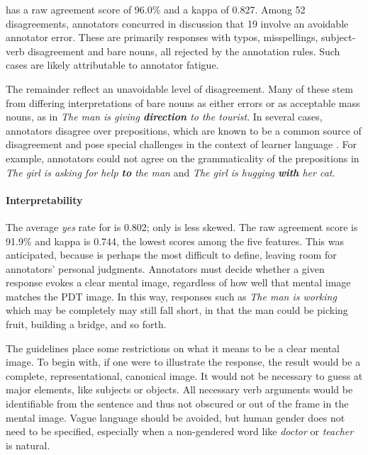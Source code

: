  has a raw agreement score of 96.0\% and a kappa of 0.827. Among 52 disagreements, annotators concurred in discussion that 19 involve an avoidable annotator error. These are primarily responses with typos, misspellings, subject-verb disagreement and bare nouns, all rejected by the annotation rules. Such cases are likely attributable to annotator fatigue.

The remainder reflect an unavoidable level of disagreement. Many of these stem from differing interpretations of bare nouns as either errors or as acceptable mass nouns, as in \textit{The man is giving \textbf{direction} to the tourist}. In several cases, annotators disagree over prepositions, which are known to be a common source of disagreement and pose special challenges in the context of learner language \citep{tetreault-chodorow:2008:HJCL,tetreault:chodorow:08}. For example, annotators could not agree on the grammaticality of the prepositions in \textit{The girl is asking for help \textbf{to} the man} and \textit{The girl is hugging \textbf{with} her cat}. 

\paragraph{Interpretability} The average \textit{yes} rate for  is 0.802; only  is less skewed.
%
The raw agreement score is 91.9\% and kappa is 0.744, the lowest scores among the five features. This was anticipated, because  is perhaps the most difficult to define, leaving room for annotators' personal judgments. Annotators must decide whether a given response evokes a clear mental image, regardless of how well that mental image matches the PDT image.  In this way, responses such as \textit{The man is working} which may %
be completely  may still fall short, in that the man could be picking fruit, building a bridge, and so forth.

The guidelines place some restrictions on what it means to be a clear mental image. To begin with, if one were to illustrate the response, the result would be a complete, representational, canonical image. It would not be necessary to guess at major elements, like subjects or objects. 
%
All necessary verb arguments would be identifiable from the sentence and thus not obscured or out of the frame in the mental image.
%
Vague language should be avoided, but human gender does not need to be specified, especially when a non-gendered word like \textit{doctor} or \textit{teacher} is natural. 

